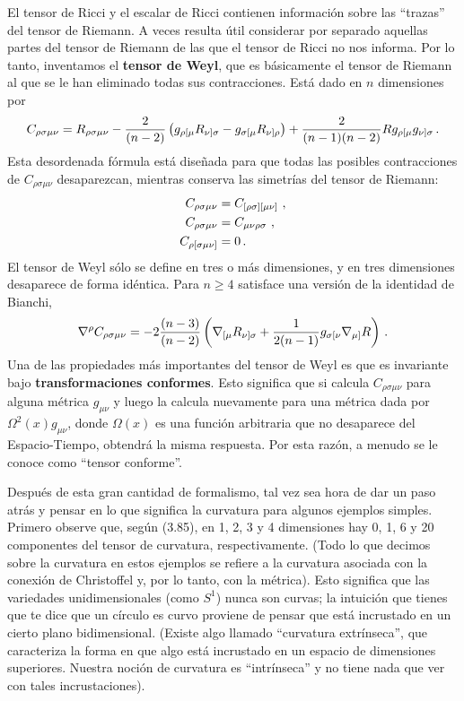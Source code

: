 \documentclass[11pt,b5paper,openany,twoside]{book}
\newcommand{\mn}{{\mu\nu}}
\begin{document}
El tensor de Ricci y el escalar de Ricci contienen información sobre las ``trazas'' del tensor de Riemann.
A veces resulta útil considerar por separado aquellas partes del tensor de Riemann de las que el tensor de Ricci no nos informa.
Por lo tanto, inventamos el {\bf tensor de Weyl}, que es básicamente el tensor de Riemann al que se le han eliminado todas sus contracciones.
Está dado en $n$ dimensiones por
\begin{equation}
C_{\rho\sigma\mn} = R_{\rho\sigma\mn} - {2\over{(n-2)}}
\left(g_{\rho[\mu}R_{\nu]\sigma} - g_{\sigma[\mu}R_{\nu]\rho}
\right) +{2\over{(n-1)(n-2)}}R g_{\rho[\mu}g_{\nu]\sigma}\,.\label{3.97}
\end{equation}
Esta desordenada fórmula está diseñada para que todas las posibles contracciones de $C_{\rho\sigma\mn}$ desaparezcan, mientras conserva las simetrías del tensor de Riemann:
\begin{align}
C_{\rho\sigma\mn} &=  C_{[\rho\sigma][\mn]}\ , \notag \\
C_{\rho\sigma\mn} &=  C_{\mn\rho\sigma}\ , \notag \\
C_{\rho[\sigma\mn]} &= 0\,. \label{3.98}
\end{align}
El tensor de Weyl sólo se define en tres o más dimensiones, y en tres dimensiones desaparece de forma idéntica.
Para $n\geq 4$ satisface una versión de la identidad de Bianchi,
\begin{equation}
\nabla^\rho C_{\rho\sigma\mn} = -2{{(n-3)}\over{(n-2)}}
\left(\nabla_{[\mu}R_{\nu]\sigma} + {1\over{2(n-1)}}
g_{\sigma[\nu}\nabla_{\mu]}R\right)\,.\label{3.99}
\end{equation}
Una de las propiedades más importantes del tensor de Weyl es que es invariante bajo {\bf transformaciones conformes}.
Esto significa que si calcula $C_{\rho\sigma\mn}$ para alguna métrica $g_{\mn}$ y luego la calcula nuevamente para una métrica dada por $\Omega^2 (x)g_{\mn}$, donde $\Omega(x)$ es una función arbitraria que no desaparece del Espacio-Tiempo, obtendrá la misma respuesta.
Por esta razón, a menudo se le conoce como ``tensor conforme''.

Después de esta gran cantidad de formalismo, tal vez sea hora de dar un paso atrás y pensar en lo que significa la curvatura para algunos ejemplos simples.
Primero observe que, según (3.85), en 1, 2, 3 y 4 dimensiones hay 0, 1, 6 y 20 componentes del tensor de curvatura, respectivamente.
(Todo lo que decimos sobre la curvatura en estos ejemplos se refiere a la curvatura asociada con la conexión de Christoffel y, por lo tanto, con la métrica).
Esto significa que las variedades unidimensionales (como $S^1$) nunca son curvas; la intuición que tienes que te dice que un círculo es curvo proviene de pensar que está incrustado en un cierto plano bidimensional.
(Existe algo llamado ``curvatura extrínseca'', que caracteriza la forma en que algo está incrustado en un espacio de dimensiones superiores.
Nuestra noción de curvatura es ``intrínseca'' y no tiene nada que ver con tales incrustaciones).
\end{document}
